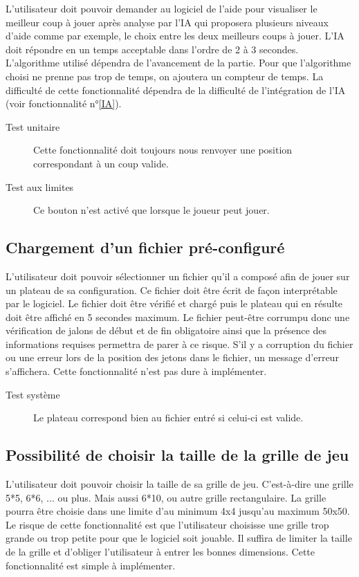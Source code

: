 L’utilisateur doit pouvoir demander au logiciel de l’aide pour visualiser le meilleur coup à jouer après analyse par l’IA qui proposera plusieurs niveaux d'aide comme par exemple, le choix entre les deux meilleurs coups à jouer. L'IA doit répondre en un temps acceptable dans l'ordre de 2 à 3 secondes. L'algorithme utilisé dépendra de l'avancement de la partie. Pour que l'algorithme choisi ne prenne pas trop de temps, on ajoutera un compteur de temps. La difficulté de cette fonctionnalité dépendra de la difficulté de l'intégration de l'IA (voir fonctionnalité n°\ref{IA}).

\begin{description}
\item[Test unitaire] Cette fonctionnalité doit toujours nous renvoyer une position correspondant à un coup valide.
\item[Test aux limites] Ce bouton n'est activé que lorsque le joueur peut jouer.
\end{description}

\subsection{Chargement d’un fichier pré-configuré}

L’utilisateur doit pouvoir sélectionner un fichier qu’il a composé afin de jouer sur un plateau de sa configuration. Ce fichier doit être écrit de façon interprétable par le logiciel. Le fichier doit être vérifié et chargé puis le plateau qui en résulte doit être affiché en 5 secondes maximum. Le fichier peut-être corrumpu donc une vérification de jalons de début et de fin obligatoire ainsi que la présence des informations requises permettra de parer à ce risque. S'il y a corruption du fichier ou une erreur lors de la position des jetons dans le fichier, un message d'erreur s'affichera. Cette fonctionnalité n'est pas dure à implémenter.

\begin{description}
\item[Test système] Le plateau correspond bien au fichier entré si celui-ci est valide.
\end{description}

\subsection{Possibilité de choisir la taille de la grille de jeu}

L'utilisateur doit pouvoir choisir la taille de sa grille de jeu. C'est-à-dire une grille 5*5, 6*6, ... ou plus. Mais aussi 6*10, ou autre grille rectangulaire. La grille pourra être choisie dans une limite d'au minimum 4x4 jusqu'au maximum 50x50. Le risque de cette fonctionnalité est que l'utilisateur choisisse une grille trop grande ou trop petite pour que le logiciel soit jouable. Il suffira de limiter la taille de la grille et d'obliger l'utilisateur à entrer les bonnes dimensions. Cette fonctionnalité est simple à implémenter.

